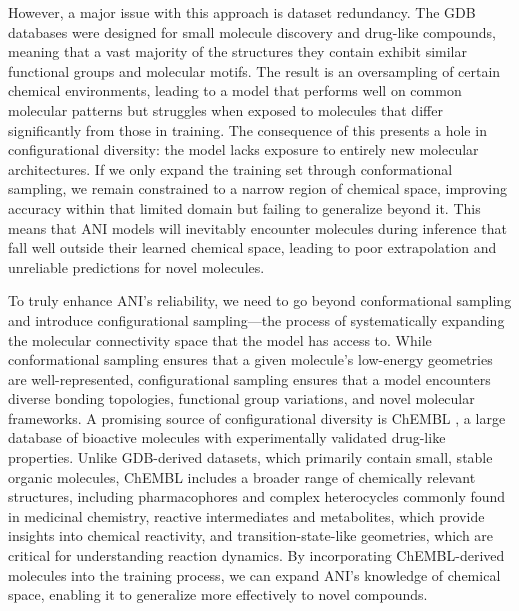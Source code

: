 However, a major issue with this approach is dataset redundancy. 
The GDB databases were designed for small molecule discovery and drug-like compounds, meaning that a vast majority of the structures they contain exhibit similar functional groups and molecular motifs. 
The result is an oversampling of certain chemical environments, leading to a model that performs well on common molecular patterns but struggles when exposed to molecules that differ significantly from those in training. 
The consequence of this presents a hole in configurational diversity: the model lacks exposure to entirely new molecular architectures. 
If we only expand the training set through conformational sampling, we remain constrained to a narrow region of chemical space, improving accuracy within that limited domain but failing to generalize beyond it.
This means that ANI models will inevitably encounter molecules during inference that fall well outside their learned chemical space, leading to poor extrapolation and unreliable predictions for novel molecules.

To truly enhance ANI’s reliability, we need to go beyond conformational sampling and introduce configurational sampling—the process of systematically expanding the molecular connectivity space that the model has access to. 
While conformational sampling ensures that a given molecule’s low-energy geometries are well-represented, configurational sampling ensures that a model encounters diverse bonding topologies, functional group variations, and novel molecular frameworks.
A promising source of configurational diversity is ChEMBL \cite{ChEMBL_gaulton}, a large database of bioactive molecules with experimentally validated drug-like properties. 
Unlike GDB-derived datasets, which primarily contain small, stable organic molecules, ChEMBL includes a broader range of chemically relevant structures, including pharmacophores and complex heterocycles commonly found in medicinal chemistry, reactive intermediates and metabolites, which provide insights into chemical reactivity, and transition-state-like geometries, which are critical for understanding reaction dynamics. 
By incorporating ChEMBL-derived molecules into the training process, we can expand ANI’s knowledge of chemical space, enabling it to generalize more effectively to novel compounds.

